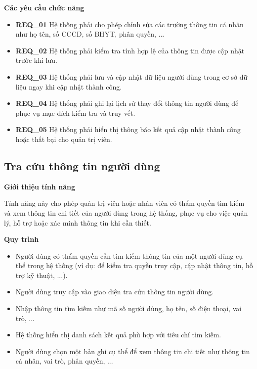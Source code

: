 \noindent \textbf{Các yêu cầu chức năng}

\begin{itemize} 
    \item \textbf{REQ\_01} Hệ thống phải cho phép chỉnh sửa các trường thông tin cá nhân như họ tên, số CCCD, số BHYT, phân quyền, ... 
    \item \textbf{REQ\_02} Hệ thống phải kiểm tra tính hợp lệ của thông tin được cập nhật trước khi lưu. 
    \item \textbf{REQ\_03} Hệ thống phải lưu và cập nhật dữ liệu người dùng trong cơ sở dữ liệu ngay khi cập nhật thành công. 
    \item \textbf{REQ\_04} Hệ thống phải ghi lại lịch sử thay đổi thông tin người dùng để phục vụ mục đích kiểm tra và truy vết. 
    \item \textbf{REQ\_05} Hệ thống phải hiển thị thông báo kết quả cập nhật thành công hoặc thất bại cho quản trị viên.
\end{itemize}


\subsection{Tra cứu thông tin người dùng}

\noindent \textbf{Giới thiệu tính năng}

Tính năng này cho phép quản trị viên hoặc nhân viên có thẩm quyền tìm kiếm và xem thông tin chi tiết của người dùng trong hệ thống, phục vụ cho việc quản lý, hỗ trợ hoặc xác minh thông tin khi cần thiết.

\noindent \textbf{Quy trình}

\begin{itemize}

    \item Người dùng có thẩm quyền cần tìm kiếm thông tin của một người dùng cụ thể trong hệ thống (ví dụ: để kiểm tra quyền truy cập, cập nhật thông tin, hỗ trợ kỹ thuật, ...).

    \item Người dùng truy cập vào giao diện tra cứu thông tin người dùng.

    \item Nhập thông tin tìm kiếm như mã số người dùng, họ tên, số điện thoại, vai trò, ...

    \item Hệ thống hiển thị danh sách kết quả phù hợp với tiêu chí tìm kiếm.

    \item Người dùng chọn một bản ghi cụ thể để xem thông tin chi tiết như thông tin cá nhân, vai trò, phân quyền, ...

\end{itemize}

